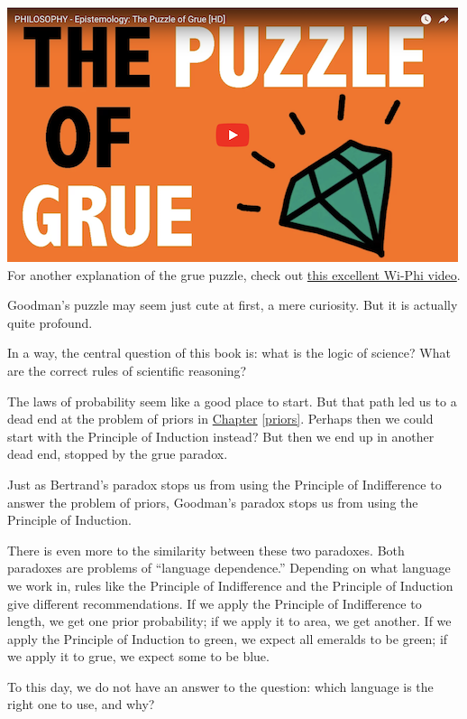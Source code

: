 \documentclass[justified]{tufte-book}
\theoremstyle{definition}
\theoremstyle{definition}
\theoremstyle{definition}
\theoremstyle{definition}
\theoremstyle{remark}
\begin{document}
\begin{marginfigure}
\href{http://www.wi-phi.com/video/puzzle-grue}{\includegraphics{img/wiphi_grue.png}}
For another explanation of the grue puzzle, check out
\href{http://www.wi-phi.com/video/puzzle-grue}{this excellent Wi-Phi
video}.
\end{marginfigure}

Goodman's puzzle may seem just cute at first, a mere curiosity. But it is actually quite profound.

In a way, the central question of this book is: what is the logic of science? What are the correct rules of scientific reasoning?

The laws of probability seem like a good place to start. But that path led us to a dead end at the problem of priors in \protect\hyperlink{priors}{Chapter} \ref{priors}. Perhaps then we could start with the Principle of Induction instead? But then we end up in another dead end, stopped by the grue paradox.

Just as Bertrand's paradox stops us from using the Principle of Indifference to answer the problem of priors, Goodman's paradox stops us from using the Principle of Induction.

There is even more to the similarity between these two paradoxes. Both paradoxes are problems of ``language dependence.'' Depending on what language we work in, rules like the Principle of Indifference and the Principle of Induction give different recommendations. If we apply the Principle of Indifference to length, we get one prior probability; if we apply it to area, we get another. If we apply the Principle of Induction to green, we expect all emeralds to be green; if we apply it to grue, we expect some to be blue.

To this day, we do not have an answer to the question: which language is the right one to use, and why?
\end{document}
